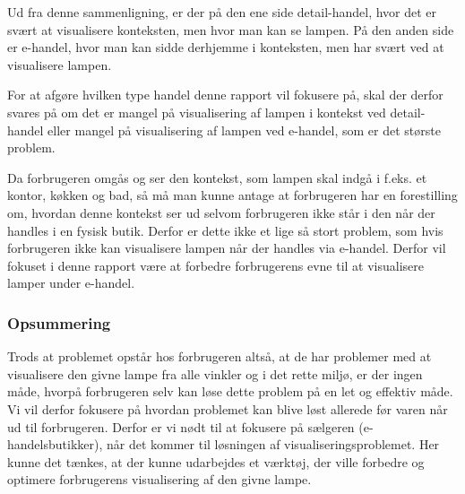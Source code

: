 Ud fra denne sammenligning, er der på den ene side detail-handel, hvor det er svært at visualisere konteksten, men hvor man kan se lampen. På den anden side er e-handel, hvor man kan sidde derhjemme i konteksten, men har svært ved at visualisere lampen. 

For at afgøre hvilken type handel denne rapport vil fokusere på, skal der derfor svares på om det er mangel på visualisering af lampen i kontekst ved detail-handel eller mangel på visualisering af lampen ved e-handel, som er det største problem.

Da forbrugeren omgås og ser den kontekst, som lampen skal indgå i f.eks. et kontor, køkken og bad, så må man kunne antage at forbrugeren har en forestilling om, hvordan denne kontekst ser ud selvom forbrugeren ikke står i den når der handles i en fysisk butik. Derfor er dette ikke et lige så stort problem, som hvis forbrugeren ikke kan visualisere lampen når der handles via e-handel. Derfor vil fokuset i denne rapport være at forbedre forbrugerens evne til at visualisere lamper under e-handel.

\subsubsection*{Opsummering}
Trods at problemet opstår hos forbrugeren altså, at de har problemer med at visualisere den givne lampe fra alle vinkler og i det rette miljø, er der ingen måde, hvorpå forbrugeren selv kan løse dette problem på en let og effektiv måde. Vi vil derfor fokusere på hvordan problemet kan blive løst allerede før varen når ud til forbrugeren. Derfor er vi nødt til at fokusere på sælgeren (e-handelsbutikker), når det kommer til løsningen af visualiseringsproblemet. Her kunne det tænkes, at der kunne udarbejdes et værktøj, der ville forbedre og optimere forbrugerens visualisering af den givne lampe.
